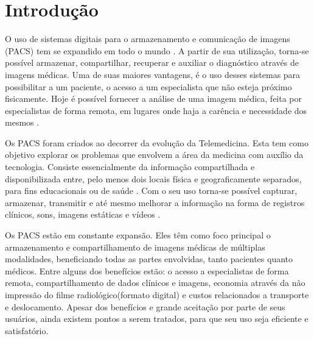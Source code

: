 \section{\esp Introdução}


O uso de sistemas digitais para o armazenamento e comunicação de imagens (PACS) tem se expandido em todo o mundo \cite{REF19}.
A partir de sua utilização, torna-se possível armazenar, compartilhar, recuperar e auxiliar o diagnóstico através de imagens médicas. 
Uma de suas maiores vantagens, é o uso desses sistemas para possibilitar a um paciente, o acesso a um especialista que não esteja próximo fisicamente. 
Hoje é possível fornecer a análise de uma imagem médica, feita por especialistas de forma remota, em lugares onde haja a carência e necessidade dos mesmos \cite{REF01} \cite{REF04}.

Os PACS foram criados ao decorrer da evolução da Telemedicina. 
Esta tem como objetivo explorar os problemas que envolvem a área da medicina com auxílio da tecnologia.
Consiste essencialmente da informação compartilhada e disponibilizada entre, pelo menos dois locais física e geograficamente separados, para fins educacionais ou de saúde \cite{REF01}. 
Com o seu uso torna-se possível capturar, armazenar, transmitir e até mesmo melhorar a informação na forma de registros clínicos, sons, imagens estáticas e vídeos \cite{REF12}.

Os PACS estão em constante expansão. Eles têm como foco principal o armazenamento e compartilhamento de imagens médicas de múltiplas modalidades, beneficiando todas as partes envolvidas, tanto pacientes quanto médicos.
Entre alguns dos benefícios estão: o acesso a especialistas de forma remota, compartilhamento de dados clínicos e imagens, economia através da não impressão do filme radiológico(formato digital) e custos relacionados a transporte e deslocamento.
Apesar dos benefícios e grande aceitação por parte de seus usuários, ainda existem pontos a serem tratados, para que seu uso seja eficiente e satisfatório.

